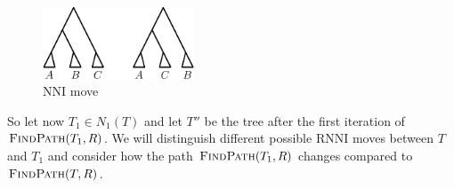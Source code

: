 \documentclass{amsart}
\newcommand{\rnni}{\mathrm{RNNI}}
\newcommand{\findpath}{\textsc{FindPath}}
\newcommand{\nni}{\mathrm{NNI}}
\begin{document}
\begin{figure}[H]
\centering
\includegraphics[width=0.4\textwidth]{NNI_move}
\vspace{12pt}
\caption{$\nni$ move}
\label{fig:nni_move}
\end{figure}

So let now $T_1 \in N_1(T)$ and let $T''$ be the tree after the first iteration of $\findpath(T_1,R)$. We will distinguish different possible $\rnni$ moves between $T$ and $T_1$ and consider how the path $\findpath(T_1,R)$ changes compared to $\findpath(T,R)$.
\end{document}
